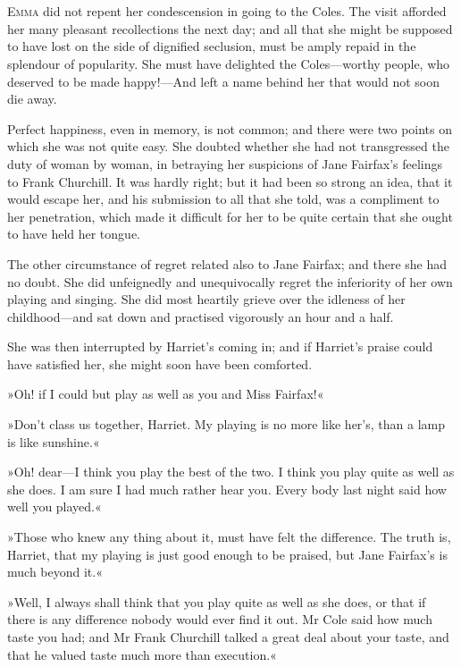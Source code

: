 \chapter[Chapter \thechapter]{}
\lettrine[lines=4,lraise=0.3]{E}{mma} did not repent her condescension in going to the Coles. The visit afforded her many pleasant recollections the next day; and all that she might be supposed to have lost on the side of dignified seclusion, must be amply repaid in the splendour of popularity. She must have delighted the Coles—worthy people, who deserved to be made happy!—And left a name behind her that would not soon die away.

Perfect happiness, even in memory, is not common; and there were two points on which she was not quite easy. She doubted whether she had not transgressed the duty of woman by woman, in betraying her suspicions of Jane Fairfax's feelings to Frank Churchill. It was hardly right; but it had been so strong an idea, that it would escape her, and his submission to all that she told, was a compliment to her penetration, which made it difficult for her to be quite certain that she ought to have held her tongue.

The other circumstance of regret related also to Jane Fairfax; and there she had no doubt. She did unfeignedly and unequivocally regret the inferiority of her own playing and singing. She did most heartily grieve over the idleness of her childhood—and sat down and practised vigorously an hour and a half.

She was then interrupted by Harriet's coming in; and if Harriet's praise could have satisfied her, she might soon have been comforted.

»Oh! if I could but play as well as you and Miss Fairfax!«

»Don't class us together, Harriet. My playing is no more like her's, than a lamp is like sunshine.«

»Oh! dear—I think you play the best of the two. I think you play quite as well as she does. I am sure I had much rather hear you. Every body last night said how well you played.«

»Those who knew any thing about it, must have felt the difference. The truth is, Harriet, that my playing is just good enough to be praised, but Jane Fairfax's is much beyond it.«

»Well, I always shall think that you play quite as well as she does, or that if there is any difference nobody would ever find it out. Mr Cole said how much taste you had; and Mr Frank Churchill talked a great deal about your taste, and that he valued taste much more than execution.«

